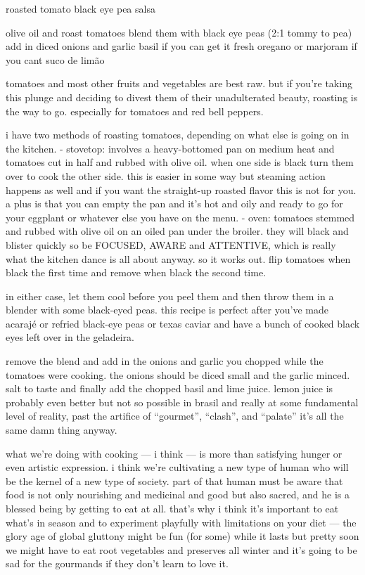 roasted tomato black eye pea salsa

olive oil and roast tomatoes
blend them with black eye peas (2:1 tommy to pea)
add in diced onions and garlic
basil if you can get it
fresh oregano or marjoram if you cant
suco de lim\~{a}o

tomatoes and most other fruits and vegetables are best raw. but if you're taking this plunge and deciding to divest them of their unadulterated beauty, roasting is the way to go. especially for tomatoes and red bell peppers.

i have two methods of roasting tomatoes, depending on what else is going on in the kitchen.
	- stovetop: involves a heavy-bottomed pan on medium heat and tomatoes cut in half and rubbed with olive oil. when one side is black turn them over to cook the other side. this is easier in some way but steaming action happens as well and if you want the straight-up roasted flavor this is not for you. a plus is that you can empty the pan and it's hot and oily and ready to go for your eggplant or whatever else you have on the menu.
	- oven: tomatoes stemmed and rubbed with olive oil on an oiled pan under the broiler. they will black and blister quickly so be FOCUSED, AWARE and ATTENTIVE, which is really what the kitchen dance is all about anyway. so it works out. flip tomatoes when black the first time and remove when black the second time.

in either case, let them cool before you peel them and then throw them in a blender with some black-eyed peas. this recipe is perfect after you've made acaraj\'{e} or refried black-eye peas or texas caviar and have a bunch of cooked black eyes left over in the geladeira.

remove the blend and add in the onions and garlic you chopped while the tomatoes were cooking. the onions should be diced small and the garlic minced. salt to taste and finally add the chopped basil and lime juice. lemon juice is probably even better but not so possible in brasil and really at some fundamental level of reality, past the artifice of ``gourmet'', ``clash'',  and ``palate'' it's all the same damn thing anyway.

what we're doing with cooking --- i think --- is more than satisfying hunger or even artistic expression. i think we're cultivating a new type of human who will be the kernel of a new type of society. part of that human must be aware that food is not only nourishing and medicinal and good but also sacred, and he is a blessed being by getting to eat at all. that's why i think it's important to eat what's in season and to experiment playfully with limitations on your diet --- the glory age of global gluttony might be fun (for some) while it lasts but pretty soon we might have to eat root vegetables and preserves all winter and it's going to be sad for the gourmands if they don't learn to love it.

